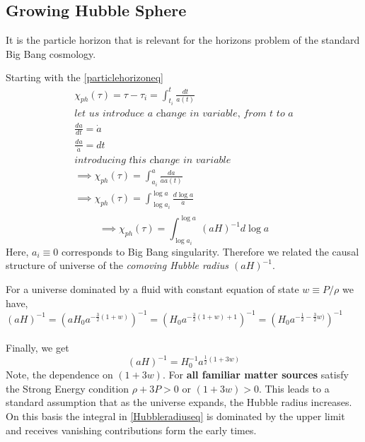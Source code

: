 \documentclass[12pt]{report}
\newcommand{\tbf}[1]{\textbf{#1}}
\newcommand{\tit}[1]{\textit{#1}}
\newcommand{\de}[2]{\frac{d{#1}}{d{#2}}}
\begin{document}
\subsection*{Growing Hubble Sphere}
It is the particle horizon that is relevant for the horizons problem of the standard Big Bang cosmology. 

Starting with the \eqref{particlehorizoneq}
\begin{eqnarray*}
\chi_{ph} (\tau)=\tau - \tau_i = \int^{t}_{t_i}{\frac{dt}{a(t)}}\\
\tit{let us introduce a change in variable, from t to a}\\
\de{a}{t}=\dot{a}\\
\frac{da}{\dot{a}}=dt\\
\tit{introducing this change in variable}\\
\implies \chi_{ph} (\tau)= \int^{a}_{a_i}{\frac{da}{\dot{a}a(t)}}\\
\implies \chi_{ph} (\tau)= \int^{\log a}_{\log a_i}{\frac{d \log a}{\dot{a}}}\\
\end{eqnarray*}
\begin{equation}\label{Hubbleradiuseq}
\implies \chi_{ph} (\tau)= \int^{\log a}_{\log a_i}{(aH)^{-1} d \log a}
\end{equation}
Here, $a_i \equiv 0$ corresponds to Big Bang singularity. Therefore we related the causal structure of universe of the \tit{comoving Hubble radius $(aH)^{-1}$}.

For a universe dominated by a fluid with constant equation of state $w \equiv P/\rho$ we have,
$(aH)^{-1}=(a H_0 a^{-\frac{3}{2}(1+w)})^{-1}=(H_0 a^{-\frac{3}{2}(1+w)+1})^{-1}=(H_0 a^{-\frac{1}{2}-\frac{3}{2}w)})^{-1}$\\\\
Finally, we get 
\begin{equation}\label{comovingHubbleradius}
(aH)^{-1}=H_0^{-1} a^{\frac{1}{2}(1+3w)}
\end{equation} 
Note, the dependence on $(1+3w)$. For \tbf{all familiar matter sources} satisfy the  Strong Energy condition $\rho+3P >0$ or $(1+3w) >0$. This leads to a standard assumption that as the universe expands, the Hubble radius increases. On this basis the integral in \eqref{Hubbleradiuseq} is dominated by the upper limit and receives vanishing contributions form the early times. 
\end{document}
